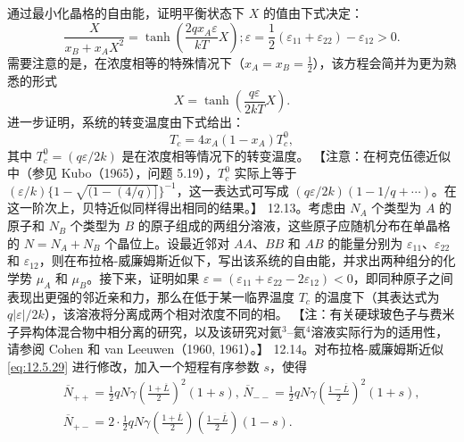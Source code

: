 通过最小化晶格的自由能，证明平衡状态下 \(X\) 的值由下式决定：
\begin{equation}\tag{12.13.35}\label{eq:12.13.35}
\frac { X } { x _ { B } + x _ { A } X ^{2} } = \operatorname { t a n h }  \left( \frac { 2 q x _ { A } \varepsilon } { k T } X \right) ;  \varepsilon = \frac { 1 } { 2 } \left( \varepsilon _ { 11 } + \varepsilon _ { 22 } \right) - \varepsilon _ { 12 } > 0 .
\end{equation}
需要注意的是，在浓度相等的特殊情况下（\(x_{A} = x_{B} = \frac{1}{2}\)），该方程会简并为更为熟悉的形式
\begin{equation}\tag{12.13.36}\label{eq:12.13.36}
X = \tanh \left( \frac{q\varepsilon}{2kT} X \right) .
\end{equation}
进一步证明，系统的转变温度由下式给出：
\begin{equation}\tag{12.13.37}\label{eq:12.13.37}
T _ { c } = 4 x _ { A } ( 1 - x _ { A } ) T _ { c } ^{0} ,
\end{equation}
其中 \(T_{c}^{0}=(q\varepsilon/2k)\) 是在浓度相等情况下的转变温度。
【注意：在柯克伍德近似中（参见 Kubo（1965），问题 5.19），\(T_{c}^{0}\) 实际上等于 \((\varepsilon/k)\{1-\sqrt{(1-(4/q)]}\}^{-1}\)，这一表达式可写成 \((q\varepsilon/2k)(1-1/q+\cdots)\)。在这一阶次上，贝特近似同样得出相同的结果。】
12.13。考虑由 \(N_A\) 个类型为 \(A\) 的原子和 \(N_B\) 个类型为 \(B\) 的原子组成的两组分溶液，这些原子应随机分布在单晶格的 \(N = N_A + N_B\) 个晶位上。设最近邻对 \(AA\)、\(BB\) 和 \(AB\) 的能量分别为 \(\varepsilon_{11}\)、\(\varepsilon_{22}\) 和 \(\varepsilon_{12}\)，则在布拉格-威廉姆斯近似下，写出该系统的自由能，并求出两种组分的化学势 \(\mu_A\) 和 \(\mu_B\)。接下来，证明如果 \(\varepsilon = (\varepsilon_{11} + \varepsilon_{22} - 2\varepsilon_{12}) < 0\)，即同种原子之间表现出更强的邻近亲和力，那么在低于某一临界温度 \(T_c\) 的温度下（其表达式为 \(q|\varepsilon|/2k\)），该溶液将分离成两个相对浓度不同的相。
【注：有关硬球玻色子与费米子异构体混合物中相分离的研究，以及该研究对氦\(^{3}\)--氦\(^{4}\)溶液实际行为的适用性，请参阅 Cohen 和 van Leeuwen（1960, 1961）。】
12.14。对布拉格-威廉姆斯近似 \autoref{eq:12.5.29} 进行修改，加入一个短程有序参数 \(s\)，使得
\begin{equation}\tag{12.13.38}\label{eq:12.13.38}
\begin{array}{rlr} & { } & { \overline { { N } } _ { + + } = \frac { 1 } { 2 } q N \gamma \left( \frac { 1 + \overline { { L } } } { 2 } \right) ^{2} ( 1 + s ) , \, \overline { { N } } _ { -- } = \frac { 1 } { 2 } q N \gamma \left( \frac { 1 - \overline { { L } } } { 2 } \right) ^{2} ( 1 + s ) , } \\& { } & { \overline { { N } } _ { + - } = 2 \cdot \frac { 1 } { 2 } q N \gamma \left( \frac { 1 + \overline { { L } } } { 2 } \right) \left( \frac { 1 - \overline { { L } } } { 2 } \right) ( 1 - s ) . } \end{array}
\end{equation}

